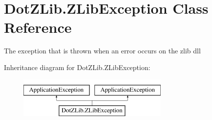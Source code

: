 \hypertarget{class_dot_z_lib_1_1_z_lib_exception}{}\section{Dot\+Z\+Lib.\+Z\+Lib\+Exception Class Reference}
\label{class_dot_z_lib_1_1_z_lib_exception}


The exception that is thrown when an error occurs on the zlib dll  


Inheritance diagram for Dot\+Z\+Lib.\+Z\+Lib\+Exception\+:\begin{figure}[H]
\begin{center}
\leavevmode
\includegraphics[height=2.000000cm]{class_dot_z_lib_1_1_z_lib_exception}
\end{center}
\end{figure}
